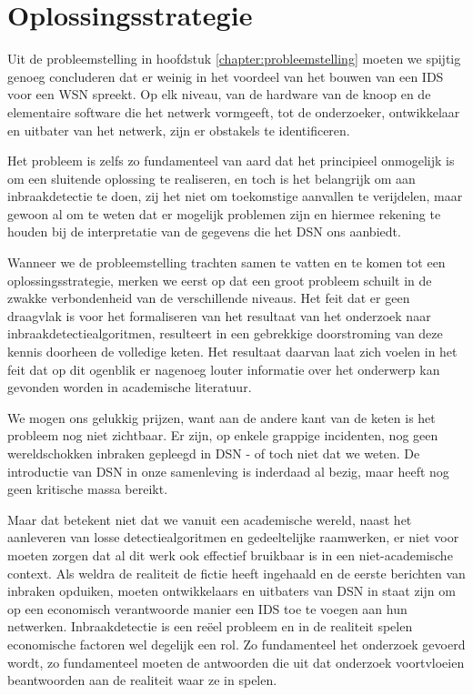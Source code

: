 
\chapter{Oplossingsstrategie}
\label{chapter:oplossingsstrategie}

Uit de probleemstelling in hoofdstuk \ref{chapter:probleemstelling} moeten we
spijtig genoeg concluderen dat er weinig in het voordeel van het bouwen van een
IDS voor een WSN spreekt. Op elk niveau, van de hardware van de knoop en de
elementaire software die het netwerk vormgeeft, tot de onderzoeker,
ontwikkelaar en uitbater van het netwerk, zijn er obstakels te identificeren.

Het probleem is zelfs zo fundamenteel van aard dat het principieel onmogelijk
is om een sluitende oplossing te realiseren, en toch is het belangrijk om aan
inbraakdetectie te doen, zij het niet om toekomstige aanvallen te verijdelen,
maar gewoon al om te weten dat er mogelijk problemen zijn en hiermee rekening
te houden bij de interpretatie van de gegevens die het DSN ons aanbiedt.

Wanneer we de probleemstelling trachten samen te vatten en te komen tot een
oplossingsstrategie, merken we eerst op dat een groot probleem schuilt in de
zwakke verbondenheid van de verschillende niveaus. Het feit dat er geen
draagvlak is voor het formaliseren van het resultaat van het onderzoek naar
inbraakdetectiealgoritmen, resulteert in een gebrekkige doorstroming van deze
kennis doorheen de volledige keten. Het resultaat daarvan laat zich voelen in
het feit dat op dit ogenblik er nagenoeg louter informatie over het onderwerp
kan gevonden worden in academische literatuur.

We mogen ons gelukkig prijzen, want aan de andere kant van de keten is het
probleem nog niet zichtbaar. Er zijn, op enkele grappige incidenten, nog geen
wereldschokken inbraken gepleegd in DSN - of toch niet dat we weten. De
introductie van DSN in onze samenleving is inderdaad al bezig, maar heeft nog
geen kritische massa bereikt.

Maar dat betekent niet dat we vanuit een academische wereld, naast het
aanleveren van losse detectiealgoritmen en gedeeltelijke raamwerken, er niet
voor moeten zorgen dat al dit werk ook effectief bruikbaar is in een
niet-academische context. Als weldra de realiteit de fictie heeft ingehaald en
de eerste berichten van inbraken opduiken, moeten ontwikkelaars en uitbaters
van DSN in staat zijn om op een economisch verantwoorde manier een IDS toe te
voegen aan hun netwerken. Inbraakdetectie is een re\"eel probleem en in de
realiteit spelen economische factoren wel degelijk een rol. Zo fundamenteel het
onderzoek gevoerd wordt, zo fundamenteel moeten de antwoorden die uit dat
onderzoek voortvloeien beantwoorden aan de realiteit waar ze in spelen.

